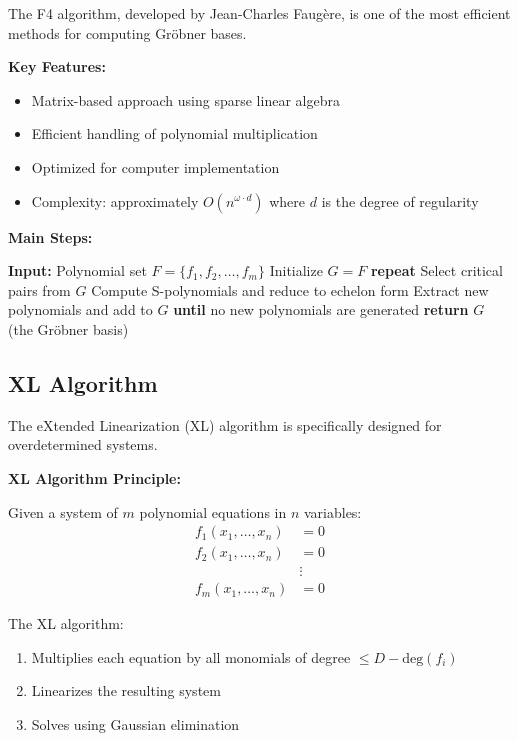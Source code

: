 \documentclass[12pt,a4paper]{article}
\newcommand{\Grobner}{Gr\"{o}bner}
\newcommand{\degree}{\text{deg}}
\begin{document}
The F4 algorithm, developed by Jean-Charles Faugère, is one of the most efficient methods for computing \Grobner{} bases.

\begin{algorithmbox}[title=F4 Algorithm Overview]
\textbf{Key Features:}
\begin{itemize}
    \item Matrix-based approach using sparse linear algebra
    \item Efficient handling of polynomial multiplication
    \item Optimized for computer implementation
    \item Complexity: approximately $O(n^{\omega \cdot d})$ where $d$ is the degree of regularity
\end{itemize}

\textbf{Main Steps:}
\begin{algorithmic}[1]
\STATE \textbf{Input:} Polynomial set $F = \{f_1, f_2, \ldots, f_m\}$
\STATE Initialize $G = F$
\STATE \textbf{repeat}
\STATE \quad Select critical pairs from $G$
\STATE \quad Compute S-polynomials and reduce to echelon form
\STATE \quad Extract new polynomials and add to $G$
\STATE \textbf{until} no new polynomials are generated
\STATE \textbf{return} $G$ (the \Grobner{} basis)
\end{algorithmic}
\end{algorithmbox}

\subsection{XL Algorithm}

The eXtended Linearization (XL) algorithm is specifically designed for overdetermined systems.

\begin{mathematicsbox}
\textbf{XL Algorithm Principle:}

Given a system of $m$ polynomial equations in $n$ variables:
\begin{align}
f_1(x_1, \ldots, x_n) &= 0 \\
f_2(x_1, \ldots, x_n) &= 0 \\
&\vdots \\
f_m(x_1, \ldots, x_n) &= 0
\end{align}

The XL algorithm:
\begin{enumerate}
    \item Multiplies each equation by all monomials of degree $\leq D-\degree(f_i)$
    \item Linearizes the resulting system
    \item Solves using Gaussian elimination
\end{enumerate}
\end{mathematicsbox}
\end{document}
